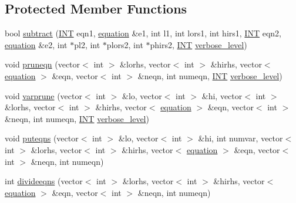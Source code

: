 \subsection*{Protected Member Functions}
\begin{DoxyCompactItemize}
\item 
bool \mbox{\hyperlink{classmckay_1_1t_m_c_k_a_y_a7a9ce2b4e5e116ea813350c4d079ac0f}{subtract}} (\mbox{\hyperlink{galois_8h_a09fddde158a3a20bd2dcadb609de11dc}{I\+NT}} eqn1, \mbox{\hyperlink{namespacemckay_a4f7cb66ed07fe573b2b08e73ab462c1a}{equation}} \&e1, int l1, int lors1, int hirs1, \mbox{\hyperlink{galois_8h_a09fddde158a3a20bd2dcadb609de11dc}{I\+NT}} eqn2, \mbox{\hyperlink{namespacemckay_a4f7cb66ed07fe573b2b08e73ab462c1a}{equation}} \&e2, int $\ast$pl2, int $\ast$plors2, int $\ast$phirs2, \mbox{\hyperlink{galois_8h_a09fddde158a3a20bd2dcadb609de11dc}{I\+NT}} \mbox{\hyperlink{simeon_8_c_a818073fbcc2f439e7c56952f67386122}{verbose\+\_\+level}})
\item 
void \mbox{\hyperlink{classmckay_1_1t_m_c_k_a_y_a0faf3830d1f34b4a6128fd237e0a9165}{pruneqn}} (vector$<$ int $>$ \&lorhs, vector$<$ int $>$ \&hirhs, vector$<$ \mbox{\hyperlink{namespacemckay_a4f7cb66ed07fe573b2b08e73ab462c1a}{equation}} $>$ \&eqn, vector$<$ int $>$ \&neqn, int numeqn, \mbox{\hyperlink{galois_8h_a09fddde158a3a20bd2dcadb609de11dc}{I\+NT}} \mbox{\hyperlink{simeon_8_c_a818073fbcc2f439e7c56952f67386122}{verbose\+\_\+level}})
\item 
void \mbox{\hyperlink{classmckay_1_1t_m_c_k_a_y_a0828f082ab8a01478033caf5e9beea92}{varprune}} (vector$<$ int $>$ \&lo, vector$<$ int $>$ \&hi, vector$<$ int $>$ \&lorhs, vector$<$ int $>$ \&hirhs, vector$<$ \mbox{\hyperlink{namespacemckay_a4f7cb66ed07fe573b2b08e73ab462c1a}{equation}} $>$ \&eqn, vector$<$ int $>$ \&neqn, int numeqn, \mbox{\hyperlink{galois_8h_a09fddde158a3a20bd2dcadb609de11dc}{I\+NT}} \mbox{\hyperlink{simeon_8_c_a818073fbcc2f439e7c56952f67386122}{verbose\+\_\+level}})
\item 
void \mbox{\hyperlink{classmckay_1_1t_m_c_k_a_y_a24360ef14adb39edfb6ad5c78ef246c2}{puteqns}} (vector$<$ int $>$ \&lo, vector$<$ int $>$ \&hi, int numvar, vector$<$ int $>$ \&lorhs, vector$<$ int $>$ \&hirhs, vector$<$ \mbox{\hyperlink{namespacemckay_a4f7cb66ed07fe573b2b08e73ab462c1a}{equation}} $>$ \&eqn, vector$<$ int $>$ \&neqn, int numeqn)
\item 
int \mbox{\hyperlink{classmckay_1_1t_m_c_k_a_y_a5083695703cb202b7c97f78990093316}{divideeqns}} (vector$<$ int $>$ \&lorhs, vector$<$ int $>$ \&hirhs, vector$<$ \mbox{\hyperlink{namespacemckay_a4f7cb66ed07fe573b2b08e73ab462c1a}{equation}} $>$ \&eqn, vector$<$ int $>$ \&neqn, int numeqn)

\end{DoxyCompactItemize}
